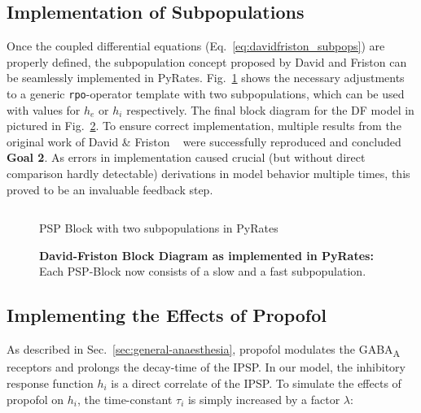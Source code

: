 \subsection{Implementation of Subpopulations}\label{subsec:implementation-of-subpopulations}
Once the coupled differential equations (Eq.~\ref{eq:davidfriston_subpops}) are properly defined,
the subpopulation concept proposed by David and Friston can be seamlessly implemented in PyRates.
Fig.~\ref{fig:subpop_pyrates} shows the necessary adjustments to a generic \texttt{rpo}-operator template
with two subpopulations,
which can be used with values for $h_e$ or $h_i$ respectively.
The final block diagram for the DF model in pictured in Fig.~\ref{fig:pyratesDFBlock}.
To ensure correct implementation,
multiple results from the original work of David \& Friston ~\cite[Fig. 4, Fig. 5, Fig. 6]{david_neural_2003}
were successfully reproduced and concluded \textbf{Goal 2}.
As errors in implementation caused crucial (but without direct comparison hardly detectable) derivations in model behavior
multiple times, this proved to be an invaluable feedback step.

\begin{figure}[H]

        \inputminted[mathescape, frame=lines, linenos, fontsize=\footnotesize, baselinestretch=1.2,
            bgcolor=LightGray, tabsize=4]
        {python3}{Chapters/Chapter_02_Theoretical_Concepts/code/psp_subpop.py}

	\caption{PSP Block with two subpopulations in PyRates}\label{fig:subpop_pyrates}
\end{figure}

\begin{figure}[H]
    
    \caption{\textbf{David-Friston Block Diagram as implemented in PyRates:}\\
        Each PSP-Block now consists of a slow and a fast subpopulation.
    }
    \label{fig:pyratesDFBlock}
\end{figure}


\subsection{Implementing the Effects of Propofol}\label{subsec:implementing-the-effects-of-propofol}

As described in Sec.~\ref{sec:general-anaesthesia},
propofol modulates the GABA\textsubscript{A} receptors and prolongs the decay-time of the IPSP.
In our model, the inhibitory response function $h_i$ is a direct correlate of the IPSP.
To simulate the effects of propofol on $h_i$, the time-constant $\tau_i$ is simply increased by a factor
$\lambda$:

